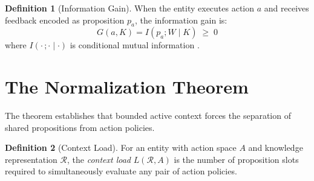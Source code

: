 \documentclass[11pt]{article}
\theoremstyle{definition}
\newtheorem{definition}{Definition}
\theoremstyle{remark}
\begin{document}
\begin{definition}[Information Gain]
\label{def:infogain}
When the entity executes action $a$ and receives feedback encoded as
proposition $p_a$, the information gain is:
\[
G(a, K) = I(p_a ; W \mid K) \;\geq\; 0
\]
where $I(\cdot\,;\cdot \mid \cdot)$ is conditional mutual information
\cite{Cover2006}.
\end{definition}

\section{The Normalization Theorem}
\label{sec:theorem}

The theorem establishes that bounded active context forces the
separation of shared propositions from action policies.

\begin{definition}[Context Load]
\label{def:load}
For an entity with action space $A$ and knowledge representation $\mathcal{R}$,
the \emph{context load} $L(\mathcal{R}, A)$ is the number of proposition
slots required to simultaneously evaluate any pair of action policies.
\end{definition}
\end{document}
